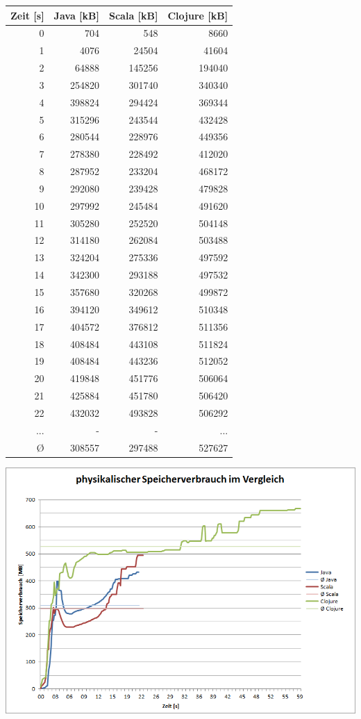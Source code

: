 \documentclass{fancydocument}
\begin{document}
\begin{center}
\begin{tabular}{|r|r|r|r|} \hline
\textbf{Zeit [s]} & \textbf{Java [kB]} & \textbf{Scala [kB]} & \textbf{Clojure [kB]}\\
\hline
0 & 704 & 548 & 8660\\
\hline
1 & 4076 & 24504 & 41604\\
\hline
2 & 64888 & 145256 & 194040\\
\hline
3 & 254820 & 301740 & 340340\\
\hline
4 & 398824 & 294424 & 369344\\
\hline
5 & 315296 & 243544 & 432428\\
\hline
6 & 280544 & 228976 & 449356\\
\hline
7 & 278380 & 228492 & 412020\\
\hline
8 & 287952 & 233204 & 468172\\
\hline
9 & 292080 & 239428 & 479828\\
\hline
10 & 297992 & 245484 & 491620\\
\hline
11 & 305280 & 252520 & 504148\\
\hline
12 & 314180 & 262084 & 503488\\
\hline
13 & 324204 & 275336 & 497592\\
\hline
14 & 342300 & 293188 & 497532\\
\hline
15 & 357680 & 320268 & 499872\\
\hline
16 & 394120 & 349612 & 510348\\
\hline
17 & 404572 & 376812 & 511356\\
\hline
18 & 408484 & 443108 & 511824\\
\hline
19 & 408484 & 443236 & 512052\\
\hline
20 & 419848 & 451776 & 506064\\
\hline
21 & 425884 & 451780 & 506420\\
\hline
22 & 432032 & 493828 & 506292\\
\hline
... & - & - & ...\\
\hline
Ø & 308557 & 297488 & 527627\\
\hline
\end{tabular}

\includegraphics[width=\linewidth]{bilder/MemoryAll.png}
\end{center}
\end{document}
